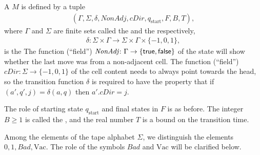 \documentclass[12pt]{memoir}
\newcommand{\fld}[1]{\ensuremath{\textit{#1}}}
\def\B{B}
\newcommand{\Bad}{\mathit{Bad}}
\newcommand{\Tu}{T}
\newcommand{\cDir}{\fld{cDir}}
\newcommand{\NonAdj}{\fld{NonAdj}}
\newcommand{\start}{\mathrm{start}}
\newcommand{\Vacant}{\mathrm{Vac}}
\begin{document}
\begin{definition}\label{def:gen-TM}
    A  \( M \) is defined by a tuple
        \begin{align}\label{eq:gen-TM}
             (\Gamma, \Sigma, \delta, \NonAdj, \cDir, q_{\start},F, \B, \Tu),
       \end{align}
    where \( \Gamma \) and \( \Sigma \) are finite sets
    called the  and the  respectively,
        \begin{align*}
             \delta: \Sigma\times \Gamma
             \to \Sigma\times \Gamma\times\{-1,0,1\},
        \end{align*}
    is the 
The function (``field'') \( \NonAdj\colon\Gamma\to\{\true,\false\} \) of the 
state will show whether the last move was from a non-adjacent cell.
The function (``field'') \( \cDir\colon\Sigma\to\{-1,0,1\} \) of the cell content
needs to always point towards the head, so 
the transition function \( \delta \) is required to have the property that
if \( (a',q',j)=\delta(a,q) \) then \( a'.\cDir=j \).

The role of starting state \( q_{\start} \) and final states in \( F \) is as before.
The integer \( \B\ge 1 \) is called the ,
and the real number \( \Tu \) is a bound on the transition time.

Among the elements of the tape alphabet \( \Sigma \), 
we distinguish the elements \( 0,1,\Bad,\Vacant \).
The role of the symbols \( \Bad \) and \( \Vacant \) will be clarified below.
\end{definition}
\end{document}
